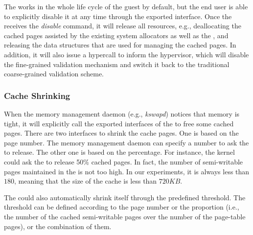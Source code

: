 The \cache works in the whole life cycle of the guest by default, but the end  user is able to explicitly disable it at any time through the exported interface.
Once the \cache receives the \emph{disable} command, it will release all resources, e.g., deallocating the cached pages assisted by the existing system allocators as well as the \module, and releasing the data structures that are used for managing the cached pages.
In addition, it will also issue a hypercall to inform the hypervisor, which will disable the fine-grained validation mechanism and switch it back to the traditional coarse-grained validation scheme.

\subsubsection{Cache Shrinking}
When the memory management daemon (e.g., \emph{kswapd}) notices that memory is tight, it will explicitly call the exported interfaces of the \cache to free some cached pages.
There are two interfaces to shrink the cache pages. One is based on the page number. The memory management daemon can specify a number to ask the \cache to release.
The other one is based on the percentage. For instance, the kernel could ask the \cache to release 50\% cached pages.
In fact, the number of semi-writable pages maintained in the \cache is not too high. In our experiments, it is always less than $180$, meaning that the size of the cache is less than $720KB$.

The \cache could also automatically shrink itself through the predefined threshold.
The threshold can be defined according to the page number or the proportion (i.e., the number of the cached semi-writable pages over the number of the page-table pages), or the combination of them.






